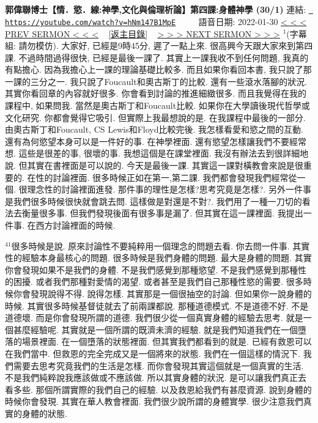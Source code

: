 \documentclass{book}
\begin{document}
\section{}
\label{sec:hNm147B1MpE}
\textbf{郭偉聯博士【情．慾．線:神學,文化與倫理析論】第四課:身體神學 (30/1)}
\newline
\newline
連結: \href{https://youtube.com/watch?v=hNm147B1MpE}{\texttt{ https://youtube.com/watch?v=hNm147B1MpE}} ~~~~ 語音日期: 2022-01-30 
\newline
\newline
\hyperref[sec:KR0XbIoYouc]{\small{< < < PREV SERMON < < <}}
~
\hyperref[sec:index]{\small{[返主目錄]}}
~
\hyperref[sec:zhKDWS7eHdY]{\small{> > > NEXT SERMON > > >}}
\newline
\newline
$^{1}$(字幕組: 請勿模仿).
大家好, 已經是9時45分, 遲了一點上來.
很高興今天跟大家來到第四課.
不過時間過得很快, 已經是最後一課了.
其實上一課我收不到任何問題, 我真的有點擔心.
因為我擔心上一課的理論基礎比較多.
而且如果你看回本書, 我只說了那一課的三分之一.
我只說了Foucault和奧古斯丁的比較.
還有一些滾水落腳的狀況.
其實你看回章的內容就好很多.
你會看到討論的推進細緻很多.
而且我覺得在我的課程中, 如果問我.
當然是奧古斯丁和Foucault比較.
如果你在大學讀後現代哲學或文化研究.
你都會覺得它吸引.
但實際上我最想說的是.
在我課程中最後的一部分.
由奧古斯丁和Foucault, CS Lewis和Floyd比較完後.
我怎樣看愛和慾之間的互動.
還有為何慾望本身可以是一件好的事.
在神學裡面.
還有慾望怎樣讓我們不要經常想.
這些是很差的事, 很壞的事.
我想這個是在課堂裡面.
我沒有辦法去到很詳細地說.
但其實在書裡面是可以說的.
今天是最後一課.
其實這一課對橫教會來說是很重要的.
在性的討論裡面.
很多時候正如在第一,第二課.
我們都會發現我們經常從一個.
很理念性的討論裡面進發.
那件事的理性是怎樣?思考究竟是怎樣?.
另外一件事是我們很多時候很快就會跳去問.
這樣做是對還是不對?.
我們用了一種一刀切的看法去衡量很多事.
但我們發現後面有很多事是漏了.
但其實在這一課裡面.
我提出一件事.
在西方討論裡面的時候.

$^{41}$很多時候是說.
原來討論性不要純粹用一個理念的問題去看.
你去問一件事.
其實性的經驗本身最核心的問題.
很多時候是我們身體的問題.
最大是身體的問題.
其實你會發現如果不是我們的身體.
不是我們感覺到那種慾望.
不是我們感覺到那種性的困擾.
或者我們那種對愛情的渴望.
或者甚至是我們自己那種性慾的需要.
很多時候你會發現說得不得.
說得怎樣.
其實那是一個很抽空的討論.
但如果你一說身體的時候.
其實很多時候基督徒就去了前兩課都說.
那種道德模式.
不是道德不好.
不是道德壞.
而是你會發現所謂的道德.
我們很少從一個真實身體的經驗去思考.
就是一個甚麼經驗呢.
其實就是一個所謂的既濟未濟的經驗.
就是我們知道我們在一個墮落的場景裡面.
在一個墮落的狀態裡面.
但其實我們都看到的就是.
已經有救恩可以在我們當中.
但救恩的完全完成又是一個將來的狀態.
我們在一個這樣的情況下.
我們需要去思考究竟我們的生活是怎樣.
而你會發現其實這個就是一個真實的生活.
不是我們純粹說我應該做或不應該做.
所以其實身體的狀況.
是可以讓我們真正去看多些.
那個所謂實際的我們自己的經驗.
以及救恩給我們有甚麼資源.
說到身體的時候你會發現.
其實在華人教會裡面.
我們很少說所謂的身體實學.
很少注意我們真實的身體的狀態.
\end{document}
